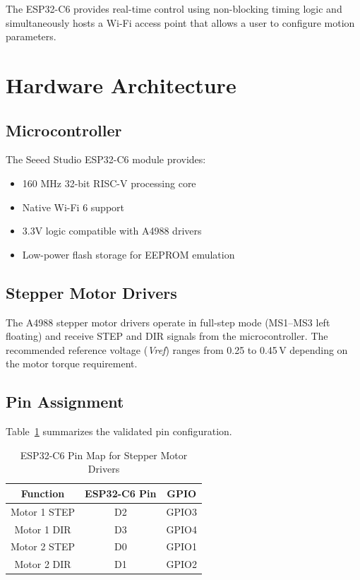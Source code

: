\documentclass[12pt]{article}
\begin{document}
The ESP32-C6 provides real-time control using non-blocking timing logic and simultaneously hosts a Wi-Fi access point that allows a user to configure motion parameters.

\section{Hardware Architecture}

\subsection{Microcontroller}

The Seeed Studio ESP32-C6 module provides:
\begin{itemize}
    \item 160 MHz 32-bit RISC-V processing core
    \item Native Wi-Fi 6 support
    \item 3.3V logic compatible with A4988 drivers
    \item Low-power flash storage for EEPROM emulation
\end{itemize}

\subsection{Stepper Motor Drivers}

The A4988 stepper motor drivers operate in full-step mode (MS1--MS3 left floating) and receive STEP and DIR signals from the microcontroller. The recommended reference voltage (\textit{Vref}) ranges from 0.25 to 0.45\,V depending on the motor torque requirement.

\subsection{Pin Assignment}

Table~\ref{tab:pins} summarizes the validated pin configuration.

\begin{table}[h!]
\centering
\caption{ESP32-C6 Pin Map for Stepper Motor Drivers}
\label{tab:pins}
\begin{tabular}{|c|c|c|}
\hline
\textbf{Function} & \textbf{ESP32-C6 Pin} & \textbf{GPIO} \\
\hline
Motor 1 STEP & D2 & GPIO3 \\
Motor 1 DIR  & D3 & GPIO4 \\
Motor 2 STEP & D0 & GPIO1 \\
Motor 2 DIR  & D1 & GPIO2 \\
\hline
\end{tabular}
\end{table}
\end{document}
